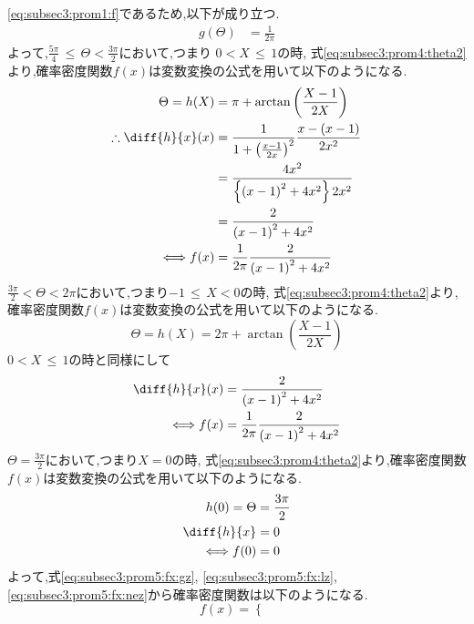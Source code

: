 \documentclass[dvipdfmx,titlepage, 11pt, a4paper]{jsarticle}%
\begin{document}
\begin{enumerate}[(1)]
  \eqref{eq:subsec3:prom1:f}であるため,以下が成り立つ.
  \begin{align*}
    g(\Theta) &= \frac{1}{2\pi}
  \end{align*}
  よって,$\frac{5\pi}{4}\, \leq\, \Theta < \frac{3\pi}{2}$において,つまり $0 < X\, \leq\, 1$の時,
  式\eqref{eq:subsec3:prom4:theta2}より,確率密度関数$f(x)$は変数変換の公式を用いて以下のようになる.
  \begin{align}
    \Theta = h(X) &= \pi + \arctan\left(\frac{X - 1}{2X}\right) \nonumber\\
    \therefore \diff{h}{x}(x) &= \frac{1}{1 + \left(\frac{x - 1}{2x}\right)^2}\frac{x - (x - 1)}{2x^2}\nonumber\\
                  &= \frac{4x^2}{\left\{\left(x - 1\right)^2 + 4x^2\right\}2x^2}\nonumber\\
                  &= \frac{2}{\left(x - 1\right)^2 + 4x^2}\nonumber\\
    \Longleftrightarrow f(x) &= \frac{1}{2\pi}\frac{2}{\left(x - 1\right)^2 + 4x^2}\label{eq:subsec3:prom5:fx:gz}
  \end{align}
  $\frac{3\pi}{2} < \Theta < 2\pi$において,つまり$-1\, \leq\, X < 0$の時,
  式\eqref{eq:subsec3:prom4:theta2}より,確率密度関数$f(x)$は変数変換の公式を用いて以下のようになる.
  \begin{equation*}
    \Theta = h(X) = 2\pi + \arctan\left(\frac{X - 1}{2X}\right)
  \end{equation*}
  $0 < X\, \leq\, 1$の時と同様にして
  \begin{align}
    \diff{h}{x}(x) &= \frac{2}{\left(x - 1\right)^2 + 4x^2}\nonumber\\
    \Longleftrightarrow f(x) &= \frac{1}{2\pi}\frac{2}{\left(x - 1\right)^2 + 4x^2}\label{eq:subsec3:prom5:fx:lz}
  \end{align}
  $\Theta = \frac{3\pi}{2}$において,つまり$X = 0$の時,
  式\eqref{eq:subsec3:prom4:theta2}より,確率密度関数$f(x)$は変数変換の公式を用いて以下のようになる.
  \begin{align}
    h(0) = \Theta &= \frac{3\pi}{2}\nonumber\\
    \diff{h}{x} &= 0\nonumber\\
    \Longleftrightarrow f(0) &= 0\label{eq:subsec3:prom5:fx:nez}
  \end{align}
  よって,式\eqref{eq:subsec3:prom5:fx:gz}, \eqref{eq:subsec3:prom5:fx:lz}, \eqref{eq:subsec3:prom5:fx:nez}から確率密度関数は以下のようになる.
  \begin{equation*}
    f(x) = 
    \begin{cases}

\end{cases}
\end{equation*}
\end{enumerate}
\end{document}

